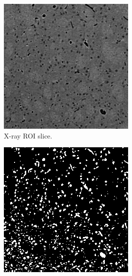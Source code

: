 \documentclass[11pt]{article}
\begin{document}
\begin{figure}[h]
  \centering
  \begin{subfigure}[b]{0.3\textwidth}
    \centering
    \includegraphics[width=0.9\linewidth]{figs/xray_sl84}
    \caption{X-ray ROI slice.}
    \label{fig:xraydata}
  \end{subfigure}
  \hspace{1em}
  \begin{subfigure}[b]{0.3\textwidth}
    \centering
    \includegraphics[width=0.9\linewidth]{figs/vasc_mask84}

\end{subfigure}
\end{figure}
\end{document}
